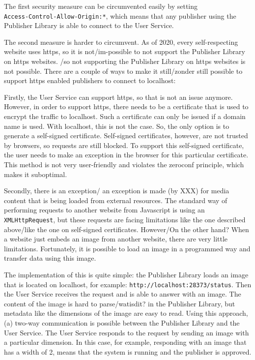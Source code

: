 The first security measure can be circumvented easily by setting \\\texttt{Access-Control-Allow-Origin:*}, which means that any publisher using the Publisher Library is able to connect to the User Service. 

The second measure is harder to circumvent. As of 2020, every self-respecting website uses https, so it is not/im-possible to not support the Publisher Library on https websites. /so not supporting the Publisher Library on https websites is not possible. There are a couple of ways to make it still/zonder still possible to support https enabled publishers to connect to localhost:

 
Firstly, the User Service can support https, so that is not an issue anymore. However, in order to support https, there needs to be a certificate that is used to encrypt the traffic to localhost. Such a certificate can only be issued if a domain name is used. With localhost, this is not the case. So, the only option is to generate a self-signed certificate. Self-signed certificates, however, are not trusted by browsers, so requests are still blocked. To support this self-signed certificate, the user needs to make an exception in the browser for this particular certificate. This method is not very user-friendly and violates the zeroconf principle, which makes it suboptimal.

Secondly, there is an exception/ an exception is made (by XXX) for media content that is being loaded from external resources. The standard way of performing requests to another website from Javascript is using an \texttt{XMLHttpRequest}, but these requests are facing limitations like the one described above/like the one on self-signed certificates. However/On the other hand? When a website just embeds an image from another website, there are very little limitations. Fortunately, it is possible to load an image in a programmed way and transfer data using this image.

The implementation of this is quite simple: the Publisher Library loads an image that is located on localhost, for example: \texttt{http://localhost:28373/status}. Then the User Service receives the request and is able to answer with an image. The content of the image is hard to parse/watisdit? in the Publisher Library, but metadata like the dimensions of the image are easy to read. Using this approach, (a) two-way communication is possible between the Publisher Library and the User Service. The User Service responds to the request by sending an image with a particular dimension. In this case, for example, responding with an image that has a width of 2, means that the system is running and the publisher is approved.

